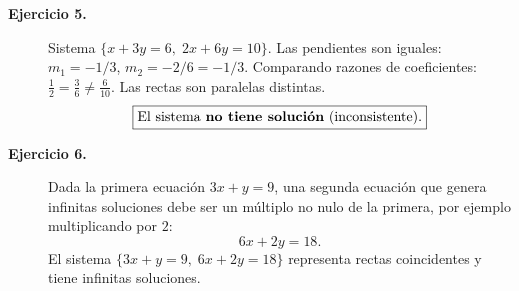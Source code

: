 \documentclass[11pt,letterpaper]{article}
\theoremstyle{definition}
\begin{document}
\begin{description}
\item[\textbf{Ejercicio 5.}]
Sistema $\{x+3y=6,\; 2x+6y=10\}$.
Las pendientes son iguales: $m_1 = -1/3$, $m_2 = -2/6 = -1/3$.
Comparando razones de coeficientes: $\frac{1}{2} = \frac{3}{6} \neq \frac{6}{10}$.
Las rectas son paralelas distintas.
\[\boxed{\text{El sistema \textbf{no tiene solución} (inconsistente).}}\]

\item[\textbf{Ejercicio 6.}]
Dada la primera ecuación $3x+y=9$, una segunda ecuación que genera infinitas soluciones debe ser un múltiplo no nulo de la primera, por ejemplo multiplicando por $2$:
\[\boxed{6x + 2y = 18.}\]
El sistema $\{3x+y=9,\; 6x+2y=18\}$ representa rectas coincidentes y tiene infinitas soluciones.

\end{description}
\end{document}
